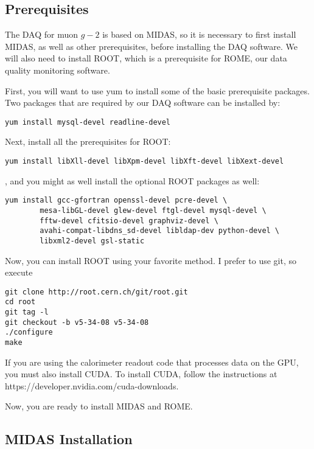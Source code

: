 \subsection{Prerequisites}
The DAQ for muon $g-2$ is based on MIDAS, so it is necessary to first install MIDAS, as well as other prerequisites, before installing the DAQ software. We will also need to install ROOT, which is a prerequisite for ROME, our data quality monitoring software.

First, you will want to use yum to install some of the basic prerequisite packages. Two packages that are required by our DAQ software can be installed by:

\begin{verbatim}
yum install mysql-devel readline-devel 
\end{verbatim}

Next, install all the prerequisites for ROOT:

\begin{verbatim}
yum install libXll-devel libXpm-devel libXft-devel libXext-devel
\end{verbatim}

, and you might as well install the optional ROOT packages as well:

\begin{verbatim}
yum install gcc-gfortran openssl-devel pcre-devel \
        mesa-libGL-devel glew-devel ftgl-devel mysql-devel \
        fftw-devel cfitsio-devel graphviz-devel \
        avahi-compat-libdns_sd-devel libldap-dev python-devel \
        libxml2-devel gsl-static
\end{verbatim}

Now, you can install ROOT using your favorite method. I prefer to use git, so execute

\begin{verbatim}
git clone http://root.cern.ch/git/root.git
cd root
git tag -l
git checkout -b v5-34-08 v5-34-08
./configure
make
\end{verbatim}

If you are using the calorimeter readout code that processes data on the GPU, you must also install CUDA. To install CUDA, follow the instructions at https://developer.nvidia.com/cuda-downloads.

Now, you are ready to install MIDAS and ROME.


\subsection{MIDAS Installation}

